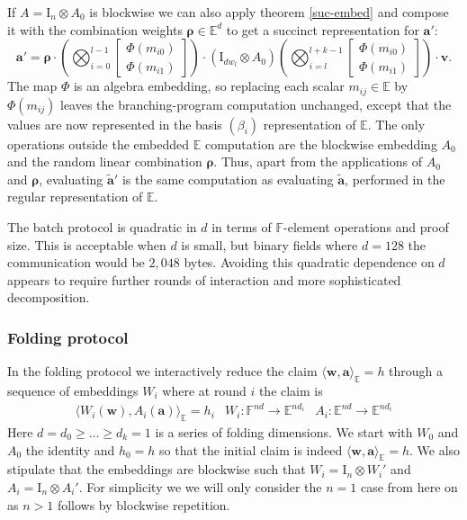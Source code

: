 If $A = \mathrm{I}_n \otimes A_0$ is blockwise we can also apply theorem \ref{suc-embed} and compose it with the combination weights $\boldsymbol{\rho} \in \mathbb{E}^d$ to get a succinct representation for $\mathbf{a}'$:
\begin{equation}
\mathbf{a}' = 
\boldsymbol{\rho} \cdot
\left(
\bigotimes_{i=0}^{l-1} 
\begin{bmatrix}
\Phi (m_{i0}) \\ \Phi (m_{i1})
\end{bmatrix}
\right) \cdot
(\mathrm{I}_{d w_l} \otimes A_0)\left(
\bigotimes_{i=l}^{l+k-1} 
\begin{bmatrix}
\Phi (m_{i0}) \\ \Phi(m_{i1})
\end{bmatrix}
\right) \cdot \mathbf{v}
\text{.}
\end{equation}
The map $\Phi$ is an algebra embedding, so replacing each scalar $m_{ij}\in\mathbb E$ by $\Phi(m_{ij})$ leaves the branching-program computation unchanged, except that the values are now represented in the basis $(\beta_i)$ representation of $\mathbb E$. The only operations outside the embedded $\mathbb{E}$ computation are the blockwise embedding $A_0$ and the random linear combination $\boldsymbol{\rho}$. Thus, apart from the applications of $A_0$ and $\boldsymbol{\rho}$, evaluating $\widetilde{\mathbf a}'$ is the same computation as evaluating $\widetilde{\mathbf a}$, performed in the regular representation of $\mathbb E$. 

The batch protocol is quadratic in $d$ in terms of $\mathbb{F}$-element operations and proof size. This is acceptable when $d$ is small, but binary fields where $d = 128$ the communication would be $2,048$ bytes. Avoiding this quadratic dependence on $d$ appears to require further rounds of interaction and more sophisticated decomposition.

\subsubsection{Folding protocol}
In the folding protocol we interactively reduce the claim $\langle \mathbf{w}, \mathbf{a}\rangle_\mathbb{E} = h$ through a sequence of embeddings $W_i$ where at round $i$ the claim is
\[
\begin{array}{ccc}
\langle W_i(\mathbf{w}), A_i(\mathbf{a})\rangle_\mathbb{E} = h_i
& W_i: \mathbb{F}^{nd} \to \mathbb{E}^{nd_i}
& A_i: \mathbb{E}^{nd} \to \mathbb{E}^{nd_i}
\end{array}
\]
Here $d = d_0 \ge \dots \ge d_k = 1$ is a series of folding dimensions. We start with $W_0$ and $A_0$ the identity and $h_0 = h$ so that the initial claim is indeed $\langle \mathbf{w}, \mathbf{a} \rangle_\mathbb{E} = h$. We also stipulate that the embeddings are blockwise such that $W_i = \mathrm{I}_n \otimes W_i'$ and $A_i = \mathrm{I}_n \otimes A_i'$. For simplicity we we will only consider the $n=1$ case from here on as $n>1$ follows by blockwise repetition.


